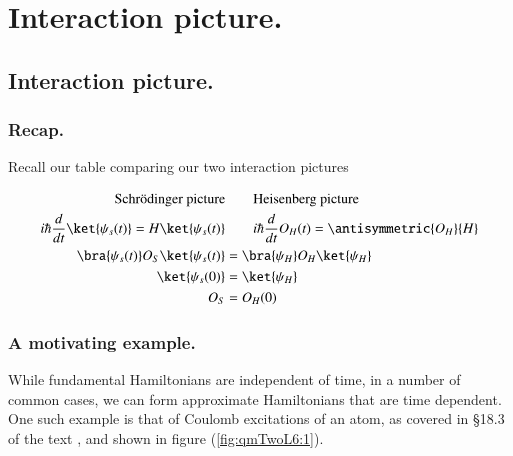 %
%

\chapter{Interaction picture.}
\label{chap:qmTwoL6}
{}
\date{Sept 26, 2011}

\beginArtWithToc

%

\section{Interaction picture.}
\subsection{Recap.}

Recall our table comparing our two interaction pictures

\begin{align*}
\text{Schr\"{o}dinger picture} &\qquad \text{Heisenberg picture} \\
i \hbar \frac{d}{dt} \ket{\psi_s(t)} = H \ket{\psi_s(t)} &\qquad i \hbar \frac{d}{dt} O_H(t) = \antisymmetric{O_H}{H} \\
\bra{\psi_s(t)} O_S \ket{\psi_s(t)} &= \bra{\psi_H} O_H \ket{\psi_H} \\
\ket{\psi_s(0)} &= \ket{\psi_H} \\
O_S &= O_H(0)
\end{align*}

\subsection{A motivating example.}

While fundamental Hamiltonians are independent of time, in a number of common cases, we can form approximate Hamiltonians that are time dependent.  One such example is that of Coulomb excitations of an atom, as covered in \S 18.3 of the text \cite{desai2009quantum}, and shown in figure (\ref{fig:qmTwoL6:1}).

